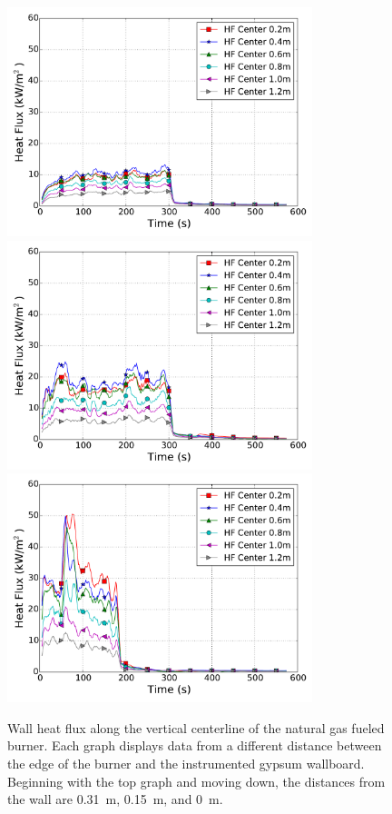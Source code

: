 \documentclass[twoside]{uocthesis}
\begin{document}
 \begin{figure}[p]
 	\centering
 	\includegraphics[width=3.5in]{../Figures/IWGBNG01_HF_Center_Avg}\\
 	\includegraphics[width=3.5in]{../Figures/IWGBNG04_HF_Center_Avg}\\
 	\includegraphics[width=3.5in]{../Figures/IWGBNG05_HF_Center_Avg}\\
 \caption[Wall heat flux along the centerline of the natural gas fueled burner]{Wall heat flux along the vertical centerline of the natural gas fueled burner. Each graph displays data from a different distance between the edge of the burner and the instrumented gypsum wallboard.  Beginning with the top graph and moving down, the distances from the wall are 0.31~m, 0.15~m, and 0~m.}
 	\label{IWGB_NG_HF_CenterSet}
 \end{figure}
\end{document}
